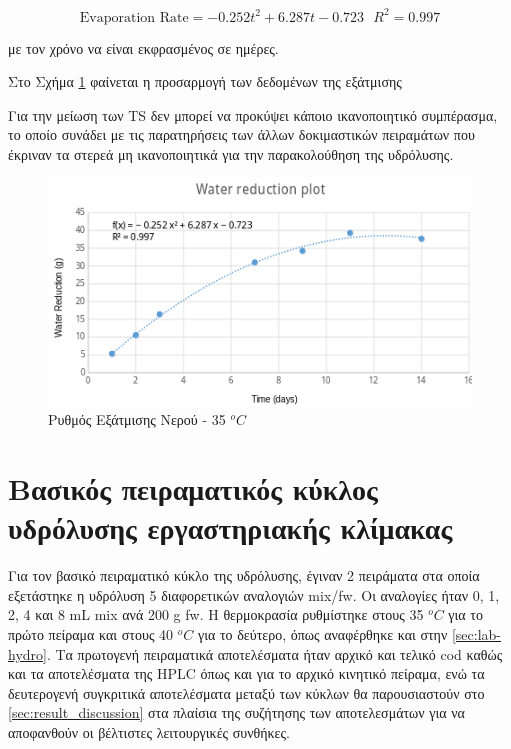 \documentclass[11pt]{report}
\begin{document}
\begin{enumerate}
\[ \text{Evaporation Rate} = -0.252t^2 + 6.287t - 0.723 ~ ~ ~ R^2 = 0.997 \]

με τον χρόνο να είναι εκφρασμένος σε ημέρες.

Στο Σχήμα \ref{fig:orgebabb4f} φαίνεται η προσαρμογή των δεδομένων της εξάτμισης

Για την μείωση των TS δεν μπορεί να προκύψει κάποιο ικανοποιητικό συμπέρασμα, το οποίο συνάδει με τις παρατηρήσεις των άλλων δοκιμαστικών πειραμάτων που έκριναν τα στερεά μη ικανοποιητικά για την παρακολούθηση της υδρόλυσης.

\begin{figure}[htbp]
\centering
\includegraphics[width=.9\linewidth]{../plots/4_12/water_reduction.png}
\caption{\label{fig:orgebabb4f}Ρυθμός Εξάτμισης Νερού - 35 \(^oC\)}
\end{figure}
\end{enumerate}

\section{Βασικός πειραματικός κύκλος υδρόλυσης εργαστηριακής κλίμακας}
\label{sec:org26141c2}
Για τον βασικό πειραματικό κύκλο της υδρόλυσης, έγιναν 2 πειράματα στα οποία εξετάστηκε η υδρόλυση 5 διαφορετικών αναλογιών \acrshort{mix}/\acrshort{fw}. Οι αναλογίες ήταν 0, 1, 2, 4 και 8 mL \acrshort{mix} ανά 200 g \acrshort{fw}. Η θερμοκρασία ρυθμίστηκε στους 35 \(^oC\) για το πρώτο πείραμα και στους 40 \(^oC\) για το δεύτερο, όπως αναφέρθηκε και στην \autoref{sec:lab-hydro}. Τα πρωτογενή πειραματικά αποτελέσματα ήταν αρχικό και τελικό \acrshort{cod} καθώς και τα αποτελέσματα της HPLC όπως και για το αρχικό κινητικό πείραμα, ενώ τα δευτερογενή συγκριτικά αποτελέσματα μεταξύ των κύκλων θα παρουσιαστούν στο \autoref{sec:result_discussion} στα πλαίσια της συζήτησης των αποτελεσμάτων για να αποφανθούν οι βέλτιστες λειτουργικές συνθήκες.
\end{document}
